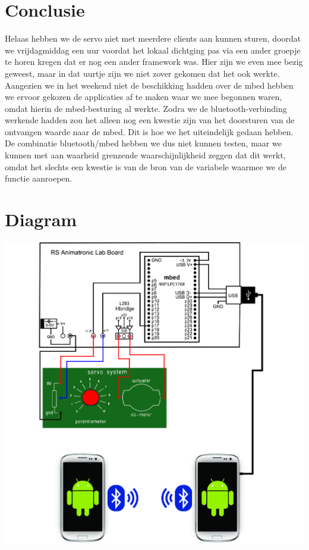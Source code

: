 \documentclass[pdftex,12pt,a4paper]{article}
\begin{document}
\section{Conclusie}
Helaas hebben we de servo niet met meerdere clients aan kunnen sturen, doordat
we vrijdagmiddag een uur voordat het lokaal dichtging pas via een ander groepje
te horen kregen dat er nog een ander framework was. Hier zijn we even mee bezig
geweest, maar in dat uurtje zijn we niet zover gekomen dat het ook werkte.
Aangezien we in het weekend niet de beschikking hadden over de mbed hebben we
ervoor gekozen de applicaties af te maken waar we mee begonnen waren, omdat
hierin de mbed-besturing al werkte. Zodra we de bluetooth-verbinding werkende
hadden zou het alleen nog een kwestie zijn van het doorsturen van de ontvangen
waarde naar de mbed. Dit is hoe we het uiteindelijk gedaan hebben. De combinatie
bluetooth/mbed hebben we dus niet kunnen testen, maar we kunnen met aan waarheid
grenzende waarschijnlijkheid zeggen dat dit werkt, omdat het slechts een kwestie
is van de bron van de variabele waarmee we de functie aanroepen.\\


\section{Diagram}
\includegraphics[width=1\textwidth]{./diagram.jpg}\\
\end{document}
